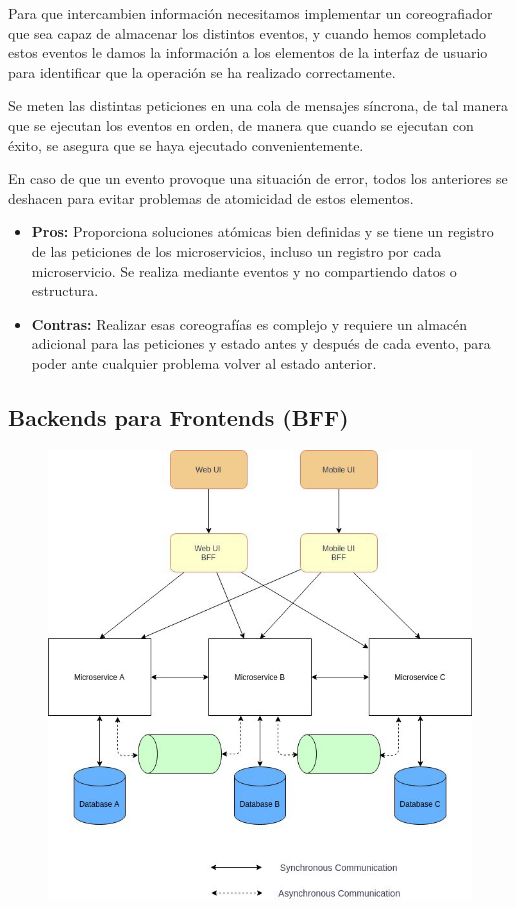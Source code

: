 \documentclass[12pt]{report} %
\begin{document}
Para que intercambien información necesitamos implementar un coreografiador que sea capaz de almacenar los distintos eventos, y cuando hemos completado estos eventos le damos la información a los elementos de la interfaz de usuario para identificar que la operación se ha realizado correctamente.

Se meten las distintas peticiones en una cola de mensajes síncrona, de tal manera que se ejecutan los eventos en orden, de manera que cuando se ejecutan con éxito, se asegura que se haya ejecutado convenientemente.

En caso de que un evento provoque una situación de error, todos los anteriores se deshacen para evitar problemas de atomicidad de estos elementos.
\begin{itemize}
	\item \textbf{Pros:} Proporciona soluciones atómicas bien definidas y se tiene un registro de las peticiones de los microservicios, incluso un registro por cada microservicio. Se realiza mediante eventos y no compartiendo datos o estructura.
	\item \textbf{Contras:} Realizar esas coreografías es complejo y requiere un almacén adicional para las peticiones y estado antes y después de cada evento,  para poder ante cualquier problema volver al estado anterior.
\end{itemize}		

\subsection{Backends para Frontends (BFF)}
\begin{figure}[H]
	{\includegraphics[scale=.3]{1_FCZRcAuSLhrNOjcq1zYXDw.jpeg}}
\end{figure}
\end{document}
